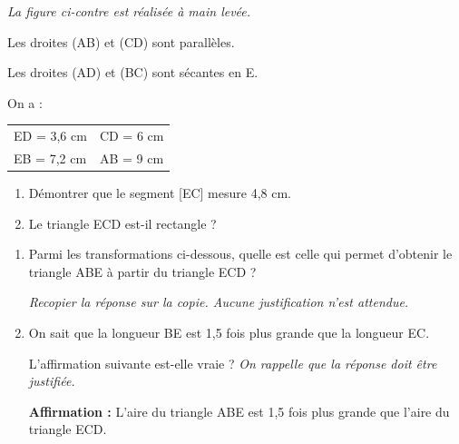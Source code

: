 \documentclass[exercice,a4]{thedocument}%
\begin{document}
%

\medskip

\begin{minipage}[t]{10cm}
\emph{La figure ci-contre est réalisée à main levée.}

Les droites (AB) et (CD) sont parallèles.

Les droites (AD) et (BC) sont sécantes en E.

On a : \begin{tabular}[t]{ll}
	ED = 3,6 cm & CD = 6 cm \\
	EB = 7,2 cm & AB = 9 cm
\end{tabular}

\begin{enumerate}
	\item Démontrer que le segment [EC] mesure 4,8 cm.

	\item Le triangle ECD est-il rectangle ?
\end{enumerate}
\end{minipage}
\hfill
{}

\begin{enumerate}[resume]
	\item Parmi les transformations ci-dessous, quelle est celle qui permet d’obtenir le triangle ABE à partir du triangle ECD ?

	\emph{Recopier la réponse sur la copie. Aucune justification n’est attendue.}

\begin{center}\quad  {}\quad  {}\quad  {}\quad  {}\end{center}
	\item On sait que la longueur BE est 1,5 fois plus grande que la longueur EC.

L’affirmation suivante est-elle vraie ? \emph{On rappelle que la réponse doit être justifiée.}

	\textbf{Affirmation :} \og L’aire du triangle ABE est 1,5 fois plus grande que l’aire du triangle ECD. \fg
\end{enumerate}

\showthesource
\end{document}

